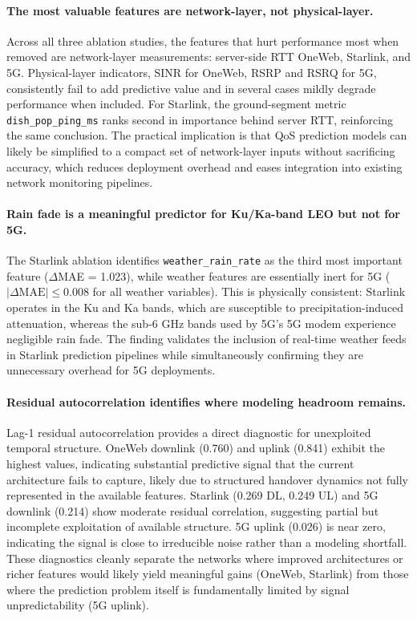 \documentclass[12pt]{article}
\begin{document}
\paragraph{The most valuable features are network-layer, not physical-layer.} Across all three ablation studies, the features that hurt performance most when removed are network-layer measurements: server-side RTT OneWeb, Starlink, and 5G. Physical-layer indicators, SINR for OneWeb, RSRP and RSRQ for 5G, consistently fail to add predictive value and in several cases mildly degrade performance when included. For Starlink, the ground-segment metric \texttt{dish\_pop\_ping\_ms} ranks second in importance behind server RTT, reinforcing the same conclusion. The practical implication is that QoS prediction models can likely be simplified to a compact set of network-layer inputs without sacrificing accuracy, which reduces deployment overhead and eases integration into existing network monitoring pipelines.

\paragraph{Rain fade is a meaningful predictor for Ku/Ka-band LEO but not for 5G.} The Starlink ablation identifies \texttt{weather\_rain\_rate} as the third most important feature ($\Delta$MAE = 1.023), while weather features are essentially inert for 5G ($|\Delta\text{MAE}| \leq 0.008$ for all weather variables). This is physically consistent: Starlink operates in the Ku and Ka bands, which are susceptible to precipitation-induced attenuation, whereas the sub-6 GHz bands used by 5G's 5G modem experience negligible rain fade. The finding validates the inclusion of real-time weather feeds in Starlink prediction pipelines while simultaneously confirming they are unnecessary overhead for 5G deployments.

\paragraph{Residual autocorrelation identifies where modeling headroom remains.} Lag-1 residual autocorrelation provides a direct diagnostic for unexploited temporal structure. OneWeb downlink (0.760) and uplink (0.841) exhibit the highest values, indicating substantial predictive signal that the current architecture fails to capture, likely due to structured handover dynamics not fully represented in the available features. Starlink (0.269 DL, 0.249 UL) and 5G downlink (0.214) show moderate residual correlation, suggesting partial but incomplete exploitation of available structure. 5G uplink (0.026) is near zero, indicating the signal is close to irreducible noise rather than a modeling shortfall. These diagnostics cleanly separate the networks where improved architectures or richer features would likely yield meaningful gains (OneWeb, Starlink) from those where the prediction problem itself is fundamentally limited by signal unpredictability (5G uplink).
\end{document}

